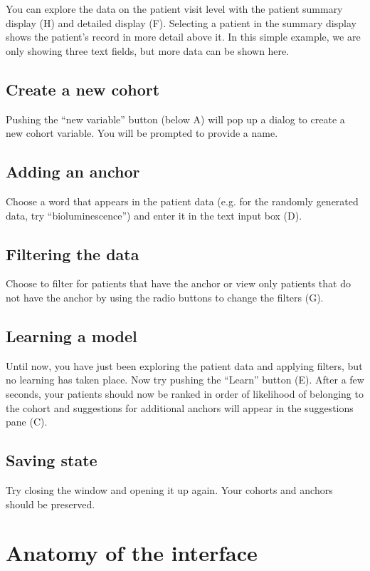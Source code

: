 \documentclass[12pt]{article}
\begin{document}
You can explore the data on the patient visit level with the patient summary display (H) and detailed display (F). Selecting a patient in the summary display shows the patient's record in more detail above it. In this simple example, we are only showing three text fields, but more data can be shown here.

\subsection{Create a new cohort}
Pushing the ``new variable'' button (below A) will pop up a dialog to create a new cohort variable. You will be prompted to provide a name.

\subsection{Adding an anchor}

Choose a word that appears in the patient data (e.g. for the randomly generated data, try ``bioluminescence'') and enter it in the text input box (D). 

\subsection{Filtering the data}

Choose to filter for patients that have the anchor or view only patients that do not have the anchor by using the radio buttons to change the filters (G).

\subsection{Learning a model}
Until now, you have just been exploring the patient data and applying filters, but no learning has taken place. Now try pushing the ``Learn'' button (E). After a few seconds, your patients should now be ranked in order of likelihood of belonging to the cohort and suggestions for additional anchors will appear in the suggestions pane (C).

\subsection{Saving state}
Try closing the window and opening it up again. Your cohorts and anchors should be preserved.

\section{Anatomy of the interface}
\label{sec:anatomy}
\end{document}
